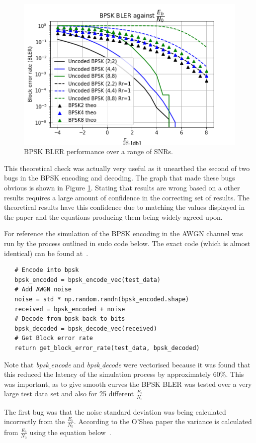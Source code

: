 \documentclass[12pt,onecolumn,letterpaper]{article}
\newcommand{\code}{\textit}
\begin{document}
\begin{figure}[t]
   \centering
   \includegraphics[width=0.6\linewidth]{figures/bpsk_theo_Rr1_and_original.png}
   \caption{BPSK BLER performance over a range of SNRs.}
   \label{fig:BspkBlerComp}
\end{figure}

This theoretical check was actually very useful as it unearthed the second of two bugs in the BPSK encoding and decoding. The graph that made these bugs obvious is shown in Figure \ref{fig:BspkBlerComp}. Stating that results are wrong based on a other results requires a large amount of confidence in the correcting set of results. The theoretical results have this confidence due to matching the values displayed in the paper and the equations producing them being widely agreed upon.

For reference the simulation of the BPSK encoding in the AWGN channel was run by the process outlined in sudo code below. The exact code (which is almost identical) can be found at~\cite{AwGithub}.

\begin{lstlisting}
   # Encode into bpsk
   bpsk_encoded = bpsk_encode_vec(test_data)
   # Add AWGN noise
   noise = std * np.random.randn(bpsk_encoded.shape)
   received = bpsk_encoded + noise
   # Decode from bpsk back to bits
   bpsk_decoded = bpsk_decode_vec(received)
   # Get Block error rate
   return get_block_error_rate(test_data, bpsk_decoded)
\end{lstlisting}

Note that \code{bpsk$\_$encode} and \code{bpsk$\_$decode} were vectorised because it was found that this reduced the latency of the simulation process by approximately $60\%$. This was important, as to give smooth curves the BPSK BLER was tested over a very large test data set and also for 25 different $\frac{E_b}{N_0}$

The first bug was that the noise standard deviation was being calculated incorrectly from the $\frac{E_b}{N_0}$. According to the O'Shea paper the variance is calculated from $\frac{E_b}{N_0}$ using the equation below~\cite{oShea}.
\end{document}
